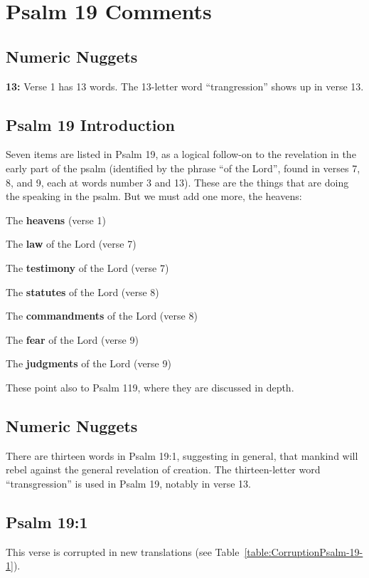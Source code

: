 \section{Psalm 19 Comments}

\subsection{Numeric Nuggets}
\textbf{13:} Verse 1 has 13 words.  The 13-letter word ``trangression'' shows up in verse 13.

\subsection{Psalm 19 Introduction}

Seven items are listed in Psalm 19, as a logical follow-on to the revelation in the early part of the psalm (identified by the phrase ``of the Lord'', found in verses 7, 8, and 9, each at words number 3 and 13). These are the things that are doing the speaking in the psalm. But we must add one more, the heavens:\\
\begin{compactenum}
	\item The \textbf{heavens}  (verse 1)
	\item The \textbf{law} of the Lord (verse 7)
	\item The \textbf{testimony} of the Lord (verse 7)
	\item The \textbf{statutes} of the Lord (verse 8)
	\item The \textbf{commandments} of the Lord (verse 8)
	\item The \textbf{fear} of the Lord (verse 9)
	\item The \textbf{judgments} of the Lord (verse 9)	\\
\end{compactenum}
\noindent These point also to Psalm 119, where they are discussed in depth.

\subsection{Numeric Nuggets}
There are thirteen words in Psalm 19:1, suggesting in general, that mankind will rebel against the general revelation of creation. The thirteen-letter word ``transgression'' is used in Psalm 19, notably in verse 13. 

\subsection{Psalm 19:1}
This verse is corrupted in new translations (see Table~\ref{table:CorruptionPsalm-19-1}).



